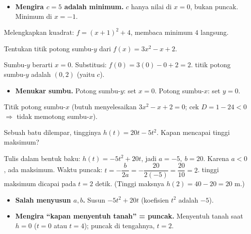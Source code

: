 \begin{jebakan}
\begin{itemize}[leftmargin=*,topsep=2pt]
  \item \textbf{Mengira $c=5$ adalah minimum.} $c$ hanya nilai di $x=0$, bukan
  puncak. Minimum di $x=-1$.
\end{itemize}
\end{jebakan}

\begin{variasi}
Melengkapkan kuadrat: $f=(x+1)^2+4$, membaca minimum $4$ langsung.
\end{variasi}

\begin{soalbox}{}
Tentukan titik potong sumbu-$y$ dari $f(x)=3x^2-x+2$.
\end{soalbox}

\jawab
{} Sumbu-$y$ berarti $x=0$. Substitusi: $f(0)=3(0)-0+2=2$.
\jadi titik potong sumbu-$y$ adalah $(0,2)$ (yaitu $c$).

\begin{jebakan}
\begin{itemize}[leftmargin=*,topsep=2pt]
  \item \textbf{Menukar sumbu.} Potong sumbu-$y$: set $x=0$. Potong sumbu-$x$:
  set $y=0$.
\end{itemize}
\end{jebakan}

\begin{variasi}
Titik potong sumbu-$x$ (butuh menyelesaikan $3x^2-x+2=0$; cek $D=1-24<0$ $\Rightarrow$
tidak memotong sumbu-$x$).
\end{variasi}

\begin{soalbox}{}
Sebuah batu dilempar, tingginya $h(t)=20t-5t^2$. Kapan mencapai tinggi
maksimum?
\end{soalbox}

\jawab
{} Tulis dalam bentuk baku: $h(t)=-5t^2+20t$, jadi $a=-5,\ b=20$.
Karena $a<0$, ada maksimum.
 Waktu puncak: $t=-\dfrac{b}{2a}=-\dfrac{20}{2(-5)}=\dfrac{20}{10}=2$.
\jadi tinggi maksimum dicapai pada $t=2$ detik. (Tinggi maksnya
$h(2)=40-20=20$ m.)

\begin{jebakan}
\begin{itemize}[leftmargin=*,topsep=2pt]
  \item \textbf{Salah menyusun $a,b$.} Susun $-5t^2+20t$ (koefisien $t^2$ adalah
  $-5$).
  \item \textbf{Mengira ``kapan menyentuh tanah'' = puncak.} Menyentuh tanah saat
  $h=0$ ($t=0$ atau $t=4$); puncak di tengahnya, $t=2$.
\end{itemize}
\end{jebakan}

